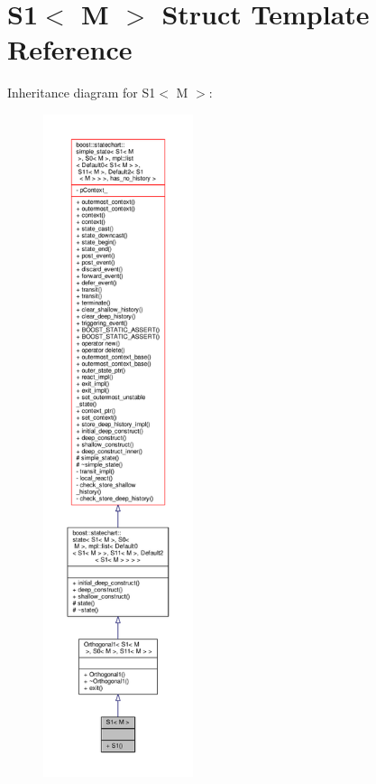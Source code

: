 \hypertarget{struct_s1}{}\section{S1$<$ M $>$ Struct Template Reference}
\label{struct_s1}


Inheritance diagram for S1$<$ M $>$\+:
\nopagebreak
\begin{figure}[H]
\begin{center}
\leavevmode
\includegraphics[height=550pt]{struct_s1__inherit__graph}
\end{center}
\end{figure}


